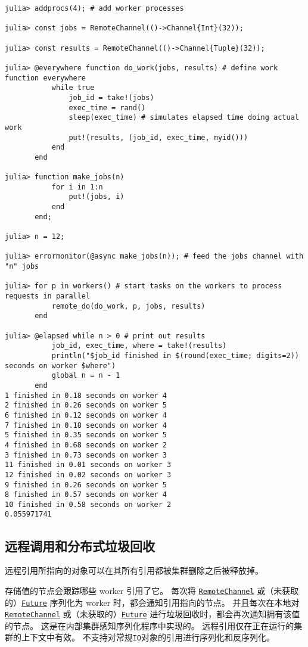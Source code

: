 \begin{verbatim}
julia> addprocs(4); # add worker processes

julia> const jobs = RemoteChannel(()->Channel{Int}(32));

julia> const results = RemoteChannel(()->Channel{Tuple}(32));

julia> @everywhere function do_work(jobs, results) # define work function everywhere
           while true
               job_id = take!(jobs)
               exec_time = rand()
               sleep(exec_time) # simulates elapsed time doing actual work
               put!(results, (job_id, exec_time, myid()))
           end
       end

julia> function make_jobs(n)
           for i in 1:n
               put!(jobs, i)
           end
       end;

julia> n = 12;

julia> errormonitor(@async make_jobs(n)); # feed the jobs channel with "n" jobs

julia> for p in workers() # start tasks on the workers to process requests in parallel
           remote_do(do_work, p, jobs, results)
       end

julia> @elapsed while n > 0 # print out results
           job_id, exec_time, where = take!(results)
           println("$job_id finished in $(round(exec_time; digits=2)) seconds on worker $where")
           global n = n - 1
       end
1 finished in 0.18 seconds on worker 4
2 finished in 0.26 seconds on worker 5
6 finished in 0.12 seconds on worker 4
7 finished in 0.18 seconds on worker 4
5 finished in 0.35 seconds on worker 5
4 finished in 0.68 seconds on worker 2
3 finished in 0.73 seconds on worker 3
11 finished in 0.01 seconds on worker 3
12 finished in 0.02 seconds on worker 3
9 finished in 0.26 seconds on worker 5
8 finished in 0.57 seconds on worker 4
10 finished in 0.58 seconds on worker 2
0.055971741
\end{verbatim}



\hypertarget{46384012603971123}{}


\subsection{远程调用和分布式垃圾回收}



远程引用所指向的对象可以在其所有引用都被集群删除之后被释放掉。



存储值的节点会跟踪哪些 worker 引用了它。 每次将 \hyperlink{16773267780467157552}{\texttt{RemoteChannel}} 或（未获取的）\hyperlink{4170271048165085864}{\texttt{Future}} 序列化为 worker 时，都会通知引用指向的节点。 并且每次在本地对 \hyperlink{16773267780467157552}{\texttt{RemoteChannel}} 或（未获取的）\hyperlink{4170271048165085864}{\texttt{Future}} 进行垃圾回收时，都会再次通知拥有该值的节点。 这是在内部集群感知序列化程序中实现的。 远程引用仅在正在运行的集群的上下文中有效。 不支持对常规\texttt{IO}对象的引用进行序列化和反序列化。



